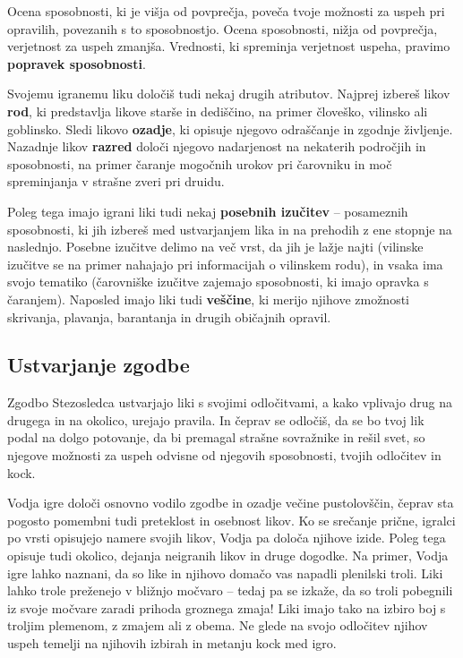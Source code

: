 Ocena sposobnosti, ki je višja od povprečja, poveča tvoje možnosti za uspeh pri opravilih, povezanih s to sposobnostjo. Ocena sposobnosti, nižja od povprečja, verjetnost za uspeh zmanjša. Vrednosti, ki spreminja verjetnost uspeha, pravimo \textbf{popravek sposobnosti}.

Svojemu igranemu liku določiš tudi nekaj drugih atributov. Najprej izbereš likov \textbf{rod}, ki predstavlja likove starše in dediščino, na primer človeško, vilinsko ali goblinsko. Sledi likovo \textbf{ozadje}, ki opisuje njegovo odraščanje in zgodnje življenje. Nazadnje likov \textbf{razred} določi njegovo nadarjenost na nekaterih področjih in sposobnosti, na primer čaranje mogočnih urokov pri čarovniku in moč spreminjanja v strašne zveri pri druidu.

Poleg tega imajo igrani liki tudi nekaj \textbf{posebnih izučitev} -- posameznih sposobnosti, ki jih izbereš med ustvarjanjem lika in na prehodih z ene stopnje na naslednjo. Posebne izučitve delimo na več vrst, da jih je lažje najti (vilinske izučitve se na primer nahajajo pri informacijah o vilinskem rodu), in vsaka ima svojo tematiko (čarovniške izučitve zajemajo sposobnosti, ki imajo opravka s čaranjem). Naposled imajo liki tudi \textbf{veščine}, ki merijo njihove zmožnosti skrivanja, plavanja, barantanja in drugih običajnih opravil.

\subsection{Ustvarjanje zgodbe}

Zgodbo Stezosledca ustvarjajo liki s svojimi odločitvami, a kako vplivajo drug na drugega in na okolico, urejajo pravila. In čeprav se odločiš, da se bo tvoj lik podal na dolgo potovanje, da bi premagal strašne sovražnike in rešil svet, so njegove možnosti za uspeh odvisne od njegovih sposobnosti, tvojih odločitev in kock.

Vodja igre določi osnovno vodilo zgodbe in ozadje večine pustolovščin, čeprav sta pogosto pomembni tudi preteklost in osebnost likov. Ko se srečanje prične, igralci po vrsti opisujejo namere svojih likov, Vodja pa določa njihove izide. Poleg tega opisuje tudi okolico, dejanja neigranih likov in druge dogodke. Na primer, Vodja igre lahko naznani, da so like in njihovo domačo vas napadli plenilski troli. Liki lahko trole preženejo v bližnjo močvaro -- tedaj pa se izkaže, da so troli pobegnili iz svoje močvare zaradi prihoda groznega zmaja! Liki imajo tako na izbiro boj s troljim plemenom, z zmajem ali z obema. Ne glede na svojo odločitev njihov uspeh temelji na njihovih izbirah in metanju kock med igro.

